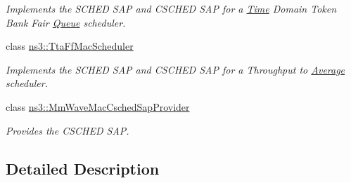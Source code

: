 \begin{DoxyCompactItemize}
\begin{DoxyCompactList}\small\item\em Implements the S\+C\+H\+ED S\+AP and C\+S\+C\+H\+ED S\+AP for a \hyperlink{classns3_1_1Time}{Time} Domain Token Bank Fair \hyperlink{classns3_1_1Queue}{Queue} scheduler. \end{DoxyCompactList}\item 
class \hyperlink{classns3_1_1TtaFfMacScheduler}{ns3\+::\+Tta\+Ff\+Mac\+Scheduler}
\begin{DoxyCompactList}\small\item\em Implements the S\+C\+H\+ED S\+AP and C\+S\+C\+H\+ED S\+AP for a Throughput to \hyperlink{classns3_1_1Average}{Average} scheduler. \end{DoxyCompactList}\item 
class \hyperlink{classns3_1_1MmWaveMacCschedSapProvider}{ns3\+::\+Mm\+Wave\+Mac\+Csched\+Sap\+Provider}
\begin{DoxyCompactList}\small\item\em Provides the C\+S\+C\+H\+ED S\+AP. \end{DoxyCompactList}\end{DoxyCompactItemize}


\subsection{Detailed Description}
